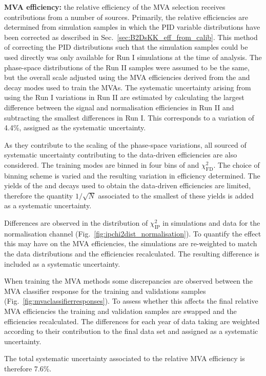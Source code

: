 \begin{description}
\item \textbf{MVA efficiency:} the relative efficiency of the MVA selection receives contributions from a number of sources. Primarily, the relative efficiencies are determined from simulation samples in which the PID variable distributions have been corrected as described in Sec.~\ref{sec:B2DsKK_eff_from_calib}. This method of correcting the PID distributions such that the simulation samples could be used directly was only available for Run I simulations at the time of analysis. The phase-space distributions of the Run II samples were assumed to be the same, but the overall scale adjusted using the MVA efficiencies derived from the \decay{\Bs}{\jpsi\phiz} and \decay{\Bsb}{\Dsp\pim} decay modes used to train the MVAs. The systematic uncertainty arising from using the Run I variations in Run II are estimated by calculating the largest difference between the signal and normalisation efficiencies in Run II and subtracting the smallest differences in Run I. This corresponds to a variation of 4.4\%, assigned as the systematic uncertainty.

As they contribute to the scaling of the phase-space variations, all sourced of systematic uncertainty contributing to the data-driven efficiencies are also considered. The training modes are binned in four bins of \pt and $\chi^{2}_{\text{FD}}$. The choice of binning scheme is varied and the resulting variation in efficiency determined. The yields of the \decay{\Bs}{\jpsi\phiz} and \decay{\Bsb}{\Dsp\pim} decays used to obtain the data-driven efficiencies are limited, therefore the quantity $1/\sqrt{N}$ associated to the smallest of these yields is added as a systematic uncertainty. 

Differences are observed in the distribution of $\chi^{2}_{\text{IP}}$ in simulations and data for the normalisation channel (Fig.~\ref{fig:ipchi2dist_normalisation}). To quantify the effect this may have on the MVA efficiencies, the simulations are re-weighted to match the data distributions and the efficiencies recalculated. The resulting difference is included as a systematic uncertainty.

When training the MVA methods some discrepancies are observed between the MVA classifier response for the training and validations samples (Fig.~\ref{fig:mvaclassifierresponses}). To assess whether this affects the final relative MVA efficiencies the training and validation samples are swapped and the efficiencies recalculated. The differences for each year of data taking are weighted according to their contribution to the final data set and assigned as a systematic uncertainty.  

The total systematic uncertainty associated to the relative MVA efficiency is therefore 7.6\%. 
\end{description}

